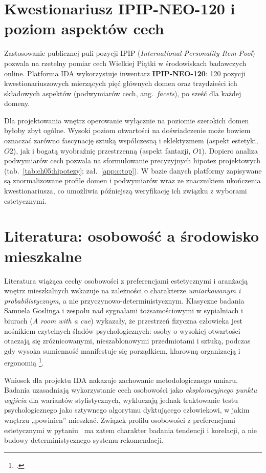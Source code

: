 \section{Kwestionariusz IPIP-NEO-120 i poziom aspektów cech}
\label{ch05:sec:ipip}

Zastosowanie publicznej puli pozycji IPIP (\emph{International Personality Item Pool}) pozwala na rzetelny pomiar cech Wielkiej Piątki w środowiskach badawczych online.
Platforma IDA wykorzystuje inwentarz \textbf{IPIP-NEO-120}: 120 pozycji kwestionariuszowych mierzących pięć głównych domen oraz trzydzieści ich składowych aspektów (podwymiarów cech, ang.\ \emph{facets}), po sześć dla każdej domeny.

Dla projektowania wnętrz operowanie wyłącznie na poziomie szerokich domen byłoby zbyt ogólne. Wysoki poziom otwartości na doświadczenie może bowiem oznaczać zarówno fascynację sztuką współczesną i eklektyzmem (aspekt estetyki, $O2$), jak i bogatą wyobraźnię przestrzenną (aspekt fantazji, $O1$). Dopiero analiza podwymiarów cech pozwala na sformułowanie precyzyjnych hipotez projektowych (tab.~\ref{tab:ch05:hipotezy}; zał.~\ref{app:c:top}).
W bazie danych platformy zapisywane są znormalizowane profile domen i podwymiarów wraz ze znacznikiem ukończenia kwestionariusza, co umożliwia późniejszą weryfikację ich związku z wyborami estetycznymi.

\section{Literatura: osobowość a środowisko mieszkalne}
\label{ch05:sec:literatura}

Literatura wiążąca cechy osobowości z preferencjami estetycznymi i aranżacją wnętrz mieszkalnych wskazuje na zależności o charakterze \emph{umiarkowanym i probabilistycznym}, a nie przyczynowo-deterministycznym.
Klasyczne badania Samuela Goslinga i zespołu nad sygnałami tożsamościowymi w sypialniach i biurach (\emph{A room with a cue}) wykazały, że przestrzeń fizyczna człowieka jest nośnikiem czytelnych śladów psychologicznych: osoby o wysokiej otwartości otaczają się zróżnicowanymi, nieszablonowymi przedmiotami i sztuką, podczas gdy wysoka sumienność manifestuje się porządkiem, klarowną organizacją i ergonomią \footcite{gosling2002room}.

Wniosek dla projektu IDA nakazuje zachowanie metodologicznego umiaru. Badania uzasadniają wykorzystanie cech osobowości jako \emph{eksploracyjnego punktu wyjścia} dla wariantów stylistycznych, wykluczają jednak traktowanie testu psychologicznego jako sztywnego algorytmu dyktującego człowiekowi, w jakim wnętrzu „powinien” mieszkać.
Związek profilu osobowości z preferencjami estetycznymi w pytaniu~ ma zatem charakter badania tendencji i korelacji, a nie budowy deterministycznego systemu rekomendacji.


